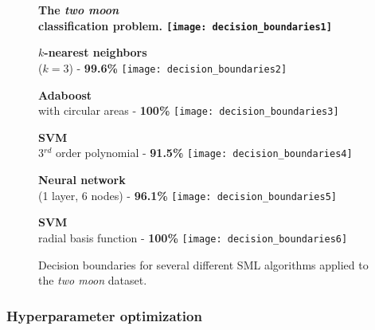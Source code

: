 \begin{figure}[b]
	\begin{minipage}{0.33\textwidth}
		\centering
		\footnotesize \bf The \emph{two moon}\\classification problem.
		\texttt{[image: decision\_boundaries1]}
	\end{minipage}
	\begin{minipage}{0.33\textwidth}
		\centering
		\footnotesize {\bf $k$-nearest neighbors}\\($k=3$) - {\bf 99.6\%}
		\texttt{[image: decision\_boundaries2]}
	\end{minipage}
	\begin{minipage}{0.33\textwidth}
		\centering
		\footnotesize {\bf Adaboost}\\with circular areas - {\bf 100\%}
		\texttt{[image: decision\_boundaries3]}
	\end{minipage}
	\begin{minipage}{0.33\textwidth}
		\centering
		\vskip0.5cm
		\footnotesize {\bf SVM}\\3$^{rd}$ order polynomial - {\bf 91.5\%}
		\texttt{[image: decision\_boundaries4]}
	\end{minipage}
	\begin{minipage}{0.33\textwidth}
		\centering
		\vskip0.5cm
		\footnotesize {\bf Neural network}\\(1 layer, 6 nodes) - {\bf 96.1\%}
		\texttt{[image: decision\_boundaries5]}
	\end{minipage}
	\begin{minipage}{0.33\textwidth}
		\centering
		\vskip0.5cm
		\footnotesize {\bf SVM}\\radial basis function - {\bf 100\%}
		\texttt{[image: decision\_boundaries6]}
	\end{minipage}
	\caption[Decision boundaries for several different SML algorithms]{Decision boundaries for
	several different SML algorithms applied to the \emph{two moon} dataset.}
	\label{fig:decision_boundaries}
\end{figure}


\subsubsection{Hyperparameter optimization}

